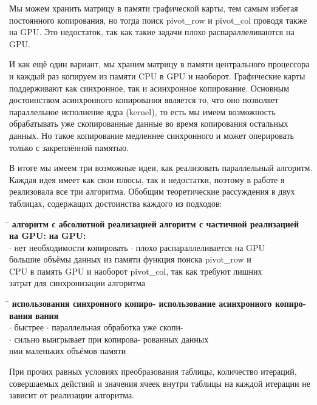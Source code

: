 \documentclass[a4paper,14pt,russian]{extreport}
\begin{document}
\par
Мы можем хранить матрицу в памяти графической карты, тем самым избегая постоянного копирования, но тогда поиск pivot\_row и pivot\_col проводя также на GPU. Это недостаток, так как такие задачи плохо распараллеливаются на GPU. 
\par
И как ещё один вариант, мы храним матрицу в памяти центрального процессора и каждый раз копируем из памяти CPU в GPU и наоборот. Графические карты поддерживают как синхронное, так и асинхронное копирование.  Основным достоинством асинхронного копирования является то, что оно позволяет параллельное исполнение ядра (kernel), то есть мы имеем возможность обрабатывать уже скопированные данные во время копирования остальных данных. Но такое копирование медленнее синхронного и может оперировать только с закреплённой памятью. 
\par
В итоге мы имеем три возможные идеи, как реализовать параллельный алгоритм. Каждая идея имеет как свои плюсы, так и недостатки, поэтому в работе я реализовала все три алгоритма. Обобщим теоретические рассуждения в двух таблицах, содержащих достоинства каждого из подходов:
\par
\begin{tabbing}
\hspace{0.5\textwidth} \= \hspace{0.5\textwidth} \kill
{\bf алгоритм с абсолютной реализацией} \> {\bf алгоритм с частичной реализацией} \\ 
{\bf на GPU:} \> {\bf на GPU:} \\
$\cdot$ нет необходимости копировать  \> $\cdot$ плохо распараллеливается на GPU  \\
большие объёмы данных из памяти  \> функция поиска pivot\_row и \\
CPU в память GPU и наоборот \> pivot\_col, так как требуют лишних  \\
 \> затрат для синхронизации алгоритма \\
\end{tabbing}
 
\begin{tabbing}
\hspace{0.5\textwidth} \= \hspace{0.5\textwidth} \kill
{\bf использования синхронного копиро-} \> {\bf использование асинхронного копиро-} \\
{\bf вания} \> {\bf вания} \\
$\cdot$ быстрее \> $\cdot$ параллельная обработка уже скопи- \\
$\cdot$ сильно выигрывает при копирова- \> рованных данных\\
нии маленьких объёмов памяти \>  
\end{tabbing}
\par
При прочих равных условиях преобразования таблицы, количество итераций, 
совершаемых действий и значения ячеек внутри таблицы на каждой итерации не зависит от реализации алгоритма. 
\end{document}
